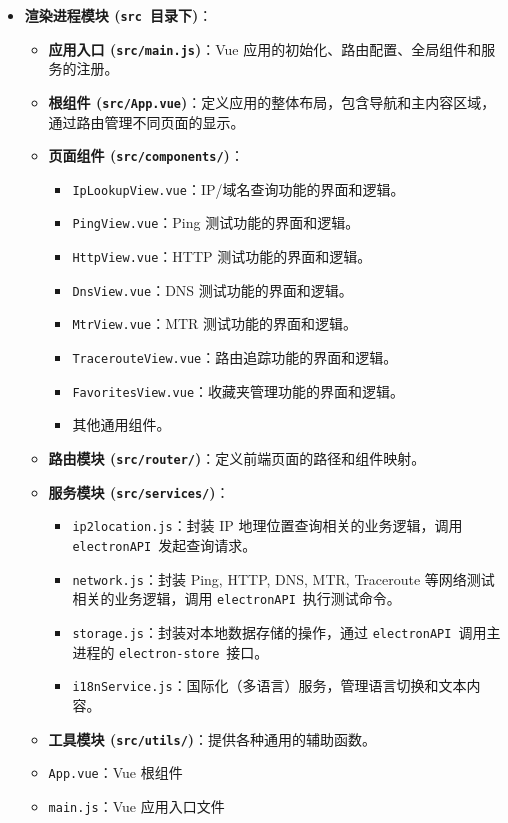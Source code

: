 \documentclass{article}
\begin{document}
\begin{itemize}
    \item \textbf{渲染进程模块 (\texttt{src}\ 目录下)}：
    \begin{itemize}
        \item \textbf{应用入口 (\texttt{src/main.js})}：Vue 应用的初始化、路由配置、全局组件和服务的注册。
        \item \textbf{根组件 (\texttt{src/App.vue})}：定义应用的整体布局，包含导航和主内容区域，通过路由管理不同页面的显示。
        \item \textbf{页面组件 (\texttt{src/components/})}：
        \begin{itemize}
            \item \texttt{IpLookupView.vue}：IP/域名查询功能的界面和逻辑。
            \item \texttt{PingView.vue}：Ping 测试功能的界面和逻辑。
            \item \texttt{HttpView.vue}：HTTP 测试功能的界面和逻辑。
            \item \texttt{DnsView.vue}：DNS 测试功能的界面和逻辑。
            \item \texttt{MtrView.vue}：MTR 测试功能的界面和逻辑。
            \item \texttt{TracerouteView.vue}：路由追踪功能的界面和逻辑。
            \item \texttt{FavoritesView.vue}：收藏夹管理功能的界面和逻辑。
            \item 其他通用组件。
        \end{itemize}
        \item \textbf{路由模块 (\texttt{src/router/})}：定义前端页面的路径和组件映射。
        \item \textbf{服务模块 (\texttt{src/services/})}：
        \begin{itemize}
            \item \texttt{ip2location.js}：封装 IP 地理位置查询相关的业务逻辑，调用 \texttt{electronAPI}\ 发起查询请求。
            \item \texttt{network.js}：封装 Ping, HTTP, DNS, MTR, Traceroute 等网络测试相关的业务逻辑，调用 \texttt{electronAPI}\ 执行测试命令。
            \item \texttt{storage.js}：封装对本地数据存储的操作，通过 \texttt{electronAPI}\ 调用主进程的 \texttt{electron-store}\ 接口。
            \item \texttt{i18nService.js}：国际化（多语言）服务，管理语言切换和文本内容。
        \end{itemize}
        \item \textbf{工具模块 (\texttt{src/utils/})}：提供各种通用的辅助函数。
        \item \texttt{App.vue}：Vue 根组件
        \item \texttt{main.js}：Vue 应用入口文件
    \end{itemize}
\end{itemize}
\end{document}
